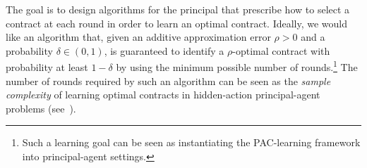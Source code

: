 The goal is to design algorithms for the principal that prescribe how to select a contract at each round in order to learn an optimal contract.
%
Ideally, we would like an algorithm that, given an additive approximation error $\rho > 0$ and a probability $\delta \in (0,1)$, is guaranteed to identify a $\rho$-optimal contract with probability at least $1-\delta$ by using the minimum possible number of rounds.\footnote{Such a learning goal can be seen as instantiating the PAC-learning framework into principal-agent settings.}
%
The number of rounds required by such an algorithm can be seen as the \emph{sample complexity} of learning optimal contracts in hidden-action principal-agent problems (see~\citep{zhu2022sample}). 
%


